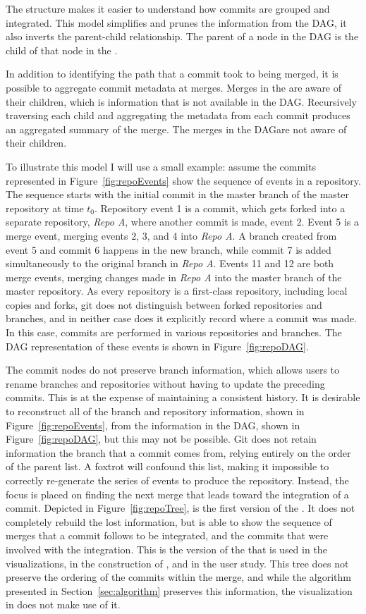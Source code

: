 The structure makes it easier to understand how commits are grouped and
integrated. This model simplifies and prunes the information from the
DAG, it also inverts the parent-child relationship. The parent of a node
in the DAG is the child of that node in the \mt{}.

In addition to identifying the path that a commit took to being merged,
it is possible to aggregate commit metadata at merges.
Merges in the \mt{} are aware of their children, which is information
that is not available in the DAG\@.
Recursively traversing each child and aggregating the metadata from each
commit produces an aggregated summary of the merge.
The merges in the DAG\@ are not aware of their children.

To illustrate this model I will use a small example: assume the commits
represented in Figure~\ref{fig:repoEvents} show the sequence of events
in a repository. The sequence starts with the initial commit in the
master branch of the master repository at time $t_0$. Repository event 1
is a commit, which gets forked into a separate repository, \textit{Repo
  A}, where another commit is made, event 2. Event 5 is a merge event,
merging events 2, 3, and 4 into \textit{Repo A}. A branch created from
event 5 and commit 6 happens in the new branch, while commit 7 is added
simultaneously to the original branch in \textit{Repo A}. Events 11 and
12 are both merge events, merging changes made in \textit{Repo A} into
the master branch of the master repository. As every repository is a
first-class repository, including local copies and forks, git does not
distinguish between forked repositories and branches, and in neither
case does it explicitly record where a commit was made. In this case,
commits are performed in various repositories and branches. The DAG
representation of these events is shown in Figure~\ref{fig:repoDAG}.

The commit nodes do not preserve branch information, which allows users
to rename branches and repositories without having to update the
preceding commits.
This is at the expense of maintaining a consistent history.
It is desirable to reconstruct all of the branch and repository
information, shown in Figure~\ref{fig:repoEvents}, from the information
in the DAG, shown in Figure~\ref{fig:repoDAG}, but this may not be
possible.
Git does not retain information the branch that a commit comes from,
relying entirely on the order of the parent list.
A foxtrot will confound this list, making it impossible to correctly
re-generate the series of events to produce the repository.
Instead, the focus is placed on finding the next merge that leads toward
the integration of a commit.
Depicted in Figure~\ref{fig:repoTree}, is the first version of the \mt{}.
It does not completely rebuild the lost information, but is able to
show the sequence of merges that a commit follows to be integrated,
and the commits that were involved with the integration.
This is the version of the \mt{} that is used in the visualizations, in
the construction of \tool{}, and in the user study.
This tree does not preserve the ordering of the commits within the
merge, and while the algorithm presented in Section~\ref{sec:algorithm}
preserves this information, the visualization in \tool{} does not make
use of it.

